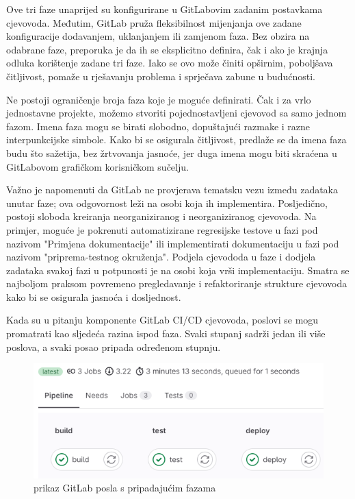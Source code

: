 \documentclass[a4paper,12pt,oneside]{article}
\begin{document}
Ove tri faze unaprijed su konfigurirane u GitLabovim zadanim postavkama cjevovoda. Međutim, GitLab pruža fleksibilnost mijenjanja ove zadane konfiguracije dodavanjem, uklanjanjem ili zamjenom faza. Bez obzira na odabrane faze, preporuka je da ih se eksplicitno definira, čak i ako je krajnja odluka korištenje zadane tri faze. Iako se ovo može činiti opširnim, poboljšava čitljivost, pomaže u rješavanju problema i sprječava zabune u budućnosti.

Ne postoji ograničenje broja faza koje je moguće definirati. Čak i za vrlo jednostavne projekte, možemo stvoriti pojednostavljeni cjevovod sa samo jednom fazom. Imena faza mogu se birati slobodno, dopuštajući razmake i razne interpunkcijske simbole. Kako bi se osigurala čitljivost, predlaže se da imena faza budu što  sažetija, bez žrtvovanja jasnoće, jer duga imena mogu biti skraćena u GitLabovom grafičkom korisničkom sučelju.

Važno je napomenuti da GitLab ne provjerava tematsku vezu između zadataka unutar faze; ova odgovornost leži na osobi koja ih implementira. Posljedično, postoji sloboda kreiranja neorganiziranog i neorganiziranog cjevovoda. Na primjer, moguće je pokrenuti automatizirane regresijske testove u fazi pod nazivom "Primjena dokumentacije" ili implementirati dokumentaciju u fazi pod nazivom "priprema-testnog okruženja". Podjela cjevododa u faze i dodjela zadataka svakoj fazi u potpunosti je na osobi koja vrši implementaciju. Smatra se najboljom praksom povremeno pregledavanje i refaktoriranje strukture cjevovoda kako bi se osigurala jasnoća i dosljednost.


Kada su u pitanju komponente GitLab CI/CD cjevovoda, poslovi se mogu promatrati kao sljedeća razina ispod faza. Svaki stupanj sadrži jedan ili više poslova, a svaki posao pripada određenom stupnju.

\begin{figure}[ht!] %
	\centering %
	\includegraphics[scale=0.5]{./Slike/gitlab ci job overview main branch.png} %
	\caption{prikaz GitLab posla s pripadajućim fazama \label{f:prikaz Gitlab posla s pripadajućim fazama}} %
\end{figure}
\end{document}
